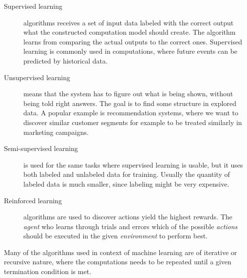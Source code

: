 \begin{description}
\item[Supervised learning] algorithms receives a set of input data labeled with the  correct output what the constructed computation model should create. The  algorithm learns from comparing the actual outputs to the correct ones. Supervised learning is commonly used in computations, where future events can be predicted by historical data. 
\item[Unsupervised learning] means that the system has to figure out what is being shown, without being told right answers. The goal is to find some structure in explored data. A popular example is recommendation systems, where we want to discover similar customer segments for example to be treated similarly in marketing campaigns.
\item[Semi-supervised learning] is used for the same tasks where supervised learning is usable, but it uses both labeled and unlabeled data for training. Usually the quantity of labeled data is much smaller, since labeling might be very expensive. 
\item[Reinforced learning] algorithms are used to discover actions yield the highest rewards. The {\textit{agent}} who learns through trials and errors which of the possible {\textit{actions}} should be executed in the given {\textit{environment}} to perform best.
\end{description}

Many of the algorithms used in context of machine learning are of iterative or recursive nature, where the computations needs to be repeated until a given termination condition is met.\cite{allroadsleadtorome}



